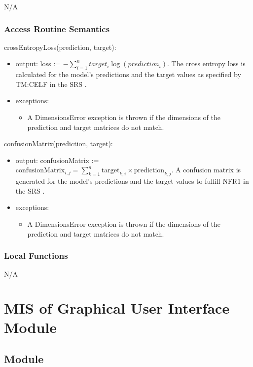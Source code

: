 \documentclass[12pt, titlepage]{article}
\begin{document}
N/A

\subsubsection{Access Routine Semantics}

\noindent crossEntropyLoss(prediction, target):
\begin{itemize}
\item output: loss := $- \sum_{i=1}^{n} target_i \log(prediction_i)$. The cross
entropy loss is calculated for the model's predictions and the target values
as specified by TM:CELF in the SRS \cite[4.2.2]{SRS}.
\item exceptions:
\begin{itemize}
  \item A DimensionsError exception is thrown if the dimensions of the prediction
  and target matrices do not match.
\end{itemize}
\end{itemize}

\noindent confusionMatrix(prediction, target):
\begin{itemize}
\item output: confusionMatrix := $\text{confusionMatrix}_{i,j} = \sum_{k=1}^{n} \text{target}_{k,i} \times \text{prediction}_{k,j}$. A confusion matrix is generated for the
model's predictions and the target values to fulfill NFR1 in the SRS
\cite[5.2]{SRS}.
\item exceptions:
\begin{itemize}
  \item A DimensionsError exception is thrown if the dimensions of the prediction
  and target matrices do not match.
\end{itemize}
\end{itemize}

\subsubsection{Local Functions}

N/A

\section{MIS of Graphical User Interface Module} \label{MGUI}

\subsection{Module}
\end{document}
